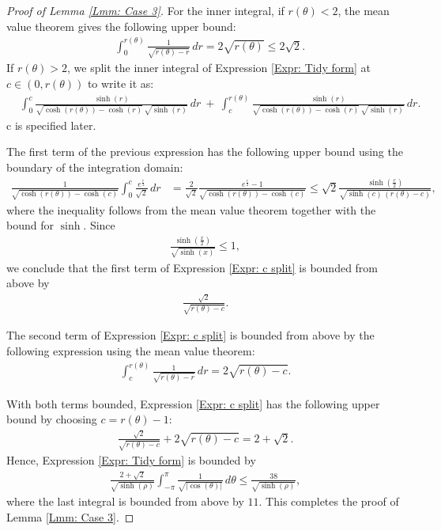 \documentclass[11pt,twoside,reqno]{amsart} \usepackage{a4wide} \usepackage[T1]{fontenc} \usepackage[utf8]{inputenc} \usepackage{soul}  \usepackage{amsmath} \usepackage{amsfonts} \usepackage{amssymb} \usepackage{mathtools} \usepackage{amsthm} \usepackage{xcolor} \usepackage{graphicx} \usepackage{hyperref} \usepackage{standalone} \usepackage{esint} \usepackage{comment} \usepackage[left=2.3cm,top=3cm,right=2.3cm]{geometry} \usepackage{bm} \usepackage{svg} \usepackage{float} \numberwithin{equation}{section} \theoremstyle{plain} \newtheorem{thm}{Theorem}[section] \newtheorem{theorem}[thm]{Theorem} \newtheorem*{theorem*}{Theorem}\newtheorem{conj}[thm]{Conjecture} \newtheorem{lemma}[thm]{Lemma} \newtheorem{prop}[thm]{Proposition} \newtheorem{proposition}[thm]{Proposition} \newtheorem{cor}[thm]{Corollary} \newtheorem{question}[thm]{Question} \newtheorem{corollary}[thm]{Corollary} \newtheorem{assumption}[thm]{Assumption} \theoremstyle{definition} \newtheorem{defn}[thm]{Definition} \newtheorem{choice}[thm]{Choice} \newtheorem{definition}[thm]{Definition} \newtheorem{ex}[thm]{Example} \newtheorem{notation}[thm]{Notation} \newtheorem*{ack}{Acknowledgements} \theoremstyle{remark} \newtheorem{remark}[thm]{Remark} \newtheorem{bigremark}[thm]{Remark} \usepackage{xcolor} \newcommand{\red}[1]{ {\color{Red}#1} } \newcommand{\blue}[1]{ {\color{Blue}#1} } \author{Kai Hippi} \address{Aalto University, Espoo, Finland} \email{kai.hippi@aalto.fi}
\begin{document}
\begin{proof}[Proof of Lemma \ref{Lmm: Case 3}]
For the inner integral, if \( r(\theta) < 2 \), the mean value theorem gives the following upper bound:
\begin{align*}
	&
	\int_{0}^{r( \theta )} \frac{1}{\sqrt{ r( \theta ) - r }} \, dr
	= 
	2\sqrt{ r( \theta ) } \leq 2 \sqrt{2}.
\end{align*}
If \( r(\theta) > 2 \), we split the inner integral of Expression \eqref{Expr: Tidy form} at \( c \in (0, r(\theta)) \) to write it as:
\begin{align}
	&
	\label{Expr: c split}
	\int_{0}^{c} \frac{\sinh( r )}{ \sqrt{ \cosh( r( \theta ) ) - \cosh( r ) } \, \sqrt{ \sinh( r ) } } \, dr \ + \ \int_{c}^{r( \theta )} \frac{\sinh( r )}{ \sqrt{ \cosh( r( \theta ) ) - \cosh( r ) } \, \sqrt{ \sinh( r ) } } \, dr.
\end{align}
c is specified later.

The first term of the previous expression has the following upper bound using the boundary of the integration domain:
\begin{align*}
\frac{1}{\sqrt{ \cosh( r(\theta) ) - \cosh( c ) }}
\int_{0}^{c} \frac{ e^{\tfrac{r}{2}} }{\sqrt{2}} \, dr
&=
\frac{2}{\sqrt{2}}
\frac{ e^{ \tfrac{c}{2} } - 1 }{\sqrt{ \cosh( r(\theta) ) - \cosh( c ) }}
\leq
\sqrt{2}
\frac{ \sinh\!\left( \tfrac{c}{2} \right) }
{ \sqrt{ \sinh(c)\,( r(\theta) - c ) } },
\end{align*}
where the inequality follows from the mean value theorem together with the bound for \( \sinh \).
Since
\begin{align*}
\frac{\sinh\!\left( \tfrac{x}{2} \right)}{\sqrt{\sinh(x)}} \leq 1,
\end{align*}
we conclude that the first term of Expression \eqref{Expr: c split} is bounded from above by
\begin{align*}
\frac{\sqrt{2}}{\sqrt{ r(\theta) - c }} .
\end{align*}

The second term of Expression \eqref{Expr: c split} is bounded from above by the following expression using the mean value theorem:
\begin{align*}
\int_{c}^{r(\theta)} \frac{1}{\sqrt{r(\theta) - r}} \, dr
= 2 \sqrt{r(\theta) - c}.
\end{align*}

With both terms bounded, Expression \eqref{Expr: c split} has the following upper bound by choosing \( c = r(\theta) - 1 \):
\begin{align*}
\frac{\sqrt{2}}{\sqrt{ r(\theta) - c }} + 2 \sqrt{ r(\theta) - c } = 2 + \sqrt{2}.
\end{align*}
Hence, Expression \eqref{Expr: Tidy form} is bounded by
\begin{align*}
\frac{2 + \sqrt{2}}{\sqrt{ \sinh(\rho) }}
\int_{-\pi}^{\pi} \frac{1}{\sqrt{|\cos(\theta)|}} \, d\theta
\leq
\frac{38}{\sqrt{ \sinh(\rho) }},
\end{align*}
where the last integral is bounded from above by \(11\). This completes the proof of Lemma \ref{Lmm: Case 3}.


\end{proof}
\end{document}
